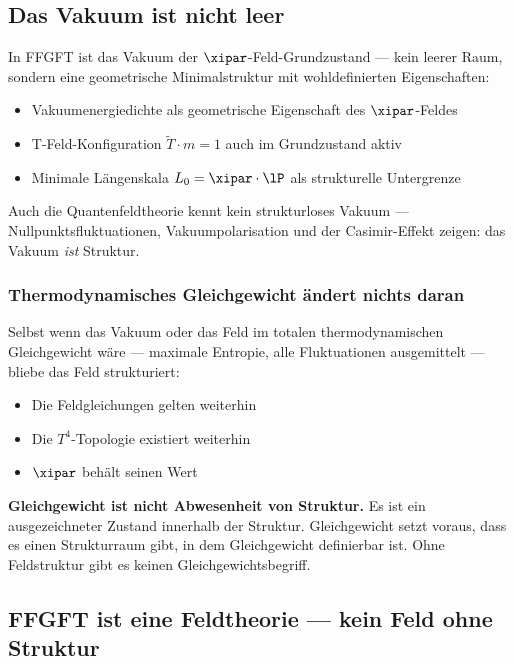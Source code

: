 \subsection{Das Vakuum ist nicht leer}

In FFGFT ist das Vakuum der $\xipar$-Feld-Grundzustand --- kein leerer Raum, sondern eine geometrische Minimalstruktur mit wohldefinierten Eigenschaften:
\begin{itemize}
  \item Vakuumenergiedichte als geometrische Eigenschaft des $\xipar$-Feldes
  \item T-Feld-Konfiguration $\tilde{T} \cdot m = 1$ auch im Grundzustand aktiv
  \item Minimale Längenskala $L_0 = \xipar \cdot \lP$ als strukturelle Untergrenze
\end{itemize}

Auch die Quantenfeldtheorie kennt kein strukturloses Vakuum --- Nullpunktsfluktuationen, Vakuumpolarisation und der Casimir-Effekt zeigen: das Vakuum \emph{ist} Struktur.

\subsubsection{Thermodynamisches Gleichgewicht ändert nichts daran}

Selbst wenn das Vakuum oder das Feld im totalen thermodynamischen Gleichgewicht wäre --- maximale Entropie, alle Fluktuationen ausgemittelt --- bliebe das Feld strukturiert:
\begin{itemize}
  \item Die Feldgleichungen gelten weiterhin
  \item Die $T^4$-Topologie existiert weiterhin
  \item $\xipar$ behält seinen Wert
\end{itemize}

\begin{wichtig}
\textbf{Gleichgewicht ist nicht Abwesenheit von Struktur.} Es ist ein ausgezeichneter Zustand innerhalb der Struktur. Gleichgewicht setzt voraus, dass es einen Strukturraum gibt, in dem Gleichgewicht definierbar ist. Ohne Feldstruktur gibt es keinen Gleichgewichtsbegriff.
\end{wichtig}

\subsection{FFGFT ist eine Feldtheorie --- kein Feld ohne Struktur}


